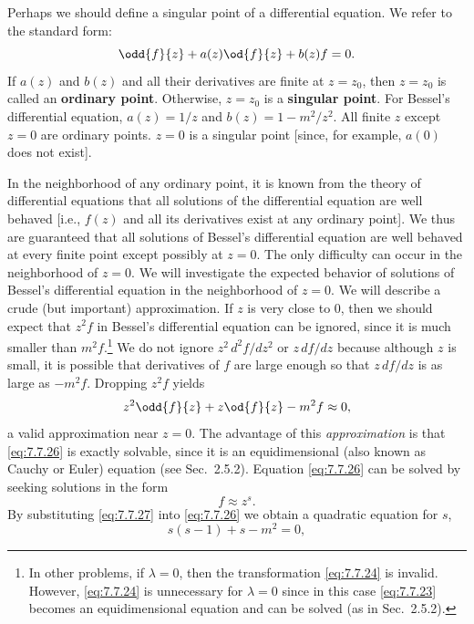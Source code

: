 Perhaps we should define a singular point of a differential equation.  We refer to the standard form:
\[
\odd{f}{z} + a(z)\od{f}{z} + b(z)f = 0.
\]
If $a(z)$ and $b(z)$ and all their derivatives are finite at $z = z_0$, then $z = z_0$ is called an \textbf{ordinary point}.  Otherwise, $z = z_0$ is a \textbf{singular point}.  For Bessel's differential equation, $a(z) = 1/z$ and $b(z) = 1 - m^2/z^2$.  All finite $z$ except $z = 0$ are ordinary points.  $z = 0$ is a singular point [since, for example, $a(0)$ does not exist].

In the neighborhood of any ordinary point, it is known from the theory of differential equations that all solutions of the differential equation are well behaved [i.e., $f(z)$ and all its derivatives exist at any ordinary point].  We thus are guaranteed that all solutions of Bessel's differential equation are well behaved at every finite point except possibly at $z = 0$.  The only difficulty can occur in the neighborhood of $z = 0$.  We will investigate the expected behavior of solutions of Bessel's differential equation in the neighborhood of $z = 0$.  We will describe a crude (but important) approximation.  If $z$ is very close to 0, then we should expect that $z^2f$ in Bessel's differential equation can be ignored, since it is much smaller than $m^2f$.\footnote{In other problems, if $\lambda = 0$, then the transformation \eqref{eq:7.7.24} is invalid.  However, \eqref{eq:7.7.24} is unnecessary for $\lambda = 0$ since in this case \eqref{eq:7.7.23} becomes an equidimensional equation and can be solved (as in Sec.~2.5.2).}  We do not ignore $z^2\,d^2f/dz^2$ or $z\,df/dz$ because although $z$ is small, it is possible that derivatives of $f$ are large enough so that $z\,df/dz$ is as large as $-m^2 f$.  Dropping $z^2 f$ yields
\begin{equation}
z^2\odd{f}{z} + z\od{f}{z} - m^2 f \approx 0,
\label{eq:7.7.26}
\end{equation}
a valid approximation near $z = 0$.  The advantage of this \emph{approximation} is that \eqref{eq:7.7.26} is exactly solvable, since it is an equidimensional (also known as Cauchy or Euler) equation (see Sec.~2.5.2).  Equation \eqref{eq:7.7.26} can be solved by seeking solutions in the form
\begin{equation}
f \approx z^s.
\label{eq:7.7.27}
\end{equation}
By substituting \eqref{eq:7.7.27} into \eqref{eq:7.7.26} we obtain a quadratic equation for $s$,
\begin{equation}
s(s-1) + s - m^2 = 0,
\label{eq:7.7.28}
\end{equation}
